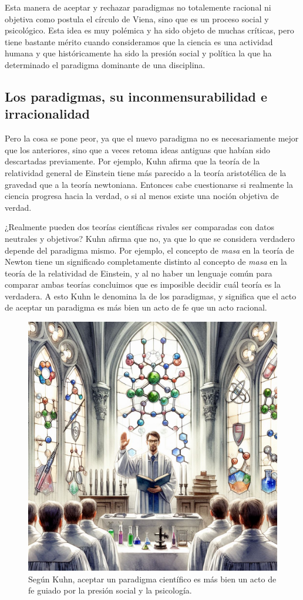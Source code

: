 Esta manera de aceptar y rechazar paradigmas no totalemente racional ni objetiva
como postula el círculo de Viena, sino que es un proceso social y psicológico.
Esta idea es muy polémica y ha sido objeto de muchas críticas, pero tiene
bastante mérito cuando consideramos que la ciencia es una actividad humana y que
históricamente ha sido la presión social y política la que ha determinado el
paradigma dominante de una disciplina.

\subsection*{Los paradigmas, su inconmensurabilidad e irracionalidad}
Pero la cosa se pone peor, ya que el nuevo paradigma no es necesariamente mejor
que los anteriores, sino que a veces retoma ideas antiguas que habían sido
descartadas previamente.
Por ejemplo, Kuhn afirma que la teoría de la relatividad general de Einstein
tiene más parecido a la teoría aristotélica de la gravedad que a la teoría
newtoniana.
Entonces cabe cuestionarse si realmente la ciencia progresa hacia la verdad, o
si al menos existe una noción objetiva de verdad.

¿Realmente pueden dos teorías científicas rivales ser comparadas con datos
neutrales y objetivos?
Kuhn afirma que no, ya que lo que se considera verdadero depende del paradigma
mismo.
Por ejemplo, el concepto de \emph{masa} en la teoría de Newton tiene un
significado completamente distinto al concepto de \emph{masa} en la teoría de la
relatividad de Einstein, y al no haber un lenguaje común para comparar ambas
teorías concluimos que es imposible decidir cuál teoría es la verdadera.
A esto Kuhn le denomina la
 de los
paradigmas, y significa que el acto de aceptar un paradigma es más bien un acto
de fe que un acto racional.

\begin{figure}[ht]
    \centering
    \includegraphics[width=0.8\linewidth]{img/actodefe}
    \caption{Según Kuhn, aceptar un paradigma científico es más bien un acto de
        fe guiado por la presión social y la psicología.}
\end{figure}

